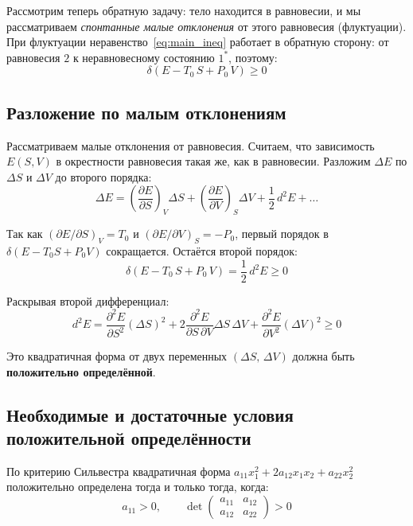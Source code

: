 \documentclass[../general/general]{subfiles}
\begin{document}
Рассмотрим теперь обратную задачу: тело находится в равновесии, и мы рассматриваем \emph{спонтанные малые отклонения} от этого равновесия (флуктуации). При флуктуации неравенство~\eqref{eq:main_ineq} работает в обратную сторону: от равновесия $2$ к неравновесному состоянию $1^*$, поэтому:
\begin{equation}
    \delta(E - T_0\,S + P_0\,V) \geq 0
    \label{eq:stab_ineq}
\end{equation}

\subsection{Разложение по малым отклонениям}

Рассматриваем малые отклонения от равновесия. Считаем, что зависимость $E(S, V)$ в окрестности равновесия такая же, как в равновесии. Разложим $\Delta E$ по $\Delta S$ и $\Delta V$ до второго порядка:
\begin{equation}
    \Delta E = \left(\frac{\partial E}{\partial S}\right)_{\!V}\!\Delta S + \left(\frac{\partial E}{\partial V}\right)_{\!S}\!\Delta V + \frac{1}{2}\,d^2 E + \ldots
\end{equation}

Так как $(\partial E/\partial S)_V = T_0$ и $(\partial E/\partial V)_S = -P_0$, первый порядок в $\delta(E - T_0 S + P_0 V)$ сокращается. Остаётся второй порядок:
\begin{equation}
    \delta(E - T_0\,S + P_0\,V) = \frac{1}{2}\,d^2E \geq 0
\end{equation}

Раскрывая второй дифференциал:
\begin{equation}
    d^2 E = \frac{\partial^2 E}{\partial S^2}(\Delta S)^2 + 2\frac{\partial^2 E}{\partial S\,\partial V}\Delta S\,\Delta V + \frac{\partial^2 E}{\partial V^2}(\Delta V)^2 \geq 0
\end{equation}

Это квадратичная форма от двух переменных $(\Delta S,\, \Delta V)$ должна быть \textbf{положительно определённой}.

\subsection{Необходимые и достаточные условия положительной определённости}

По критерию Сильвестра квадратичная форма $a_{11}x_1^2 + 2a_{12}x_1 x_2 + a_{22}x_2^2$ положительно определена тогда и только тогда, когда:
\begin{equation}
    a_{11} > 0, \qquad \det\begin{pmatrix} a_{11} & a_{12} \\ a_{12} & a_{22} \end{pmatrix} > 0
\end{equation}
\end{document}
